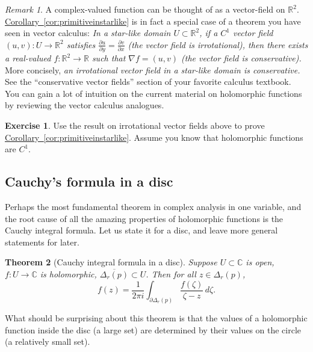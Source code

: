 \documentclass[12pt,openany]{book}
\newcommand{\C}{{\mathbb{C}}}
\newcommand{\R}{{\mathbb{R}}}
\theoremstyle{plain}
\newtheorem{thm}{Theorem}[section]
\theoremstyle{remark}
\newtheorem{remark}[thm]{Remark}
\theoremstyle{definition}
\newenvironment{exbox}{%
    \def\FrameCommand{\vrule width 1pt \relax\hspace{10pt}}%
    \MakeFramed{\advance\hsize-\width\FrameRestore}%
}{%
    \endMakeFramed
}
\theoremstyle{exercise}
\newtheorem{exercise}{Exercise}[section]
\theoremstyle{example}
\newcommand{\corref}[1]{\hyperref[#1]{Corollary~\ref*{#1}}}
\begin{document}
\begin{remark}
A complex-valued function can be thought of as a vector-field on $\R^2$.
\corref{cor:primitiveinstarlike}
is in fact a special case of a theorem you have seen
in vector calculus:  \emph{In a star-like domain $U \subset \R^2$, if a
$C^1$ vector field $(u,v) \colon U \to \R^2$
satisfies $\frac{\partial u}{\partial y} = \frac{\partial v}{\partial x}$
(the vector field is \emph{irrotational}),
then there exists a real-valued $f \colon \R^2 \to \R$ such that
$\nabla f = (u,v)$ (the vector field is conservative).}
More concisely, \emph{an irrotational vector field
in a star-like domain is conservative.}  See the ``conservative vector
fields'' section of your favorite calculus textbook.  You can gain a lot of
intuition on the current material on holomorphic functions by reviewing the
vector calculus analogues.
\end{remark}

\begin{exbox}
\begin{exercise}
Use the result on irrotational vector fields above to prove 
\corref{cor:primitiveinstarlike}.
Assume you know that holomorphic functions are $C^1$.
\end{exercise}
\end{exbox}

\subsection{Cauchy's formula in a disc}

Perhaps the most fundamental theorem in complex analysis in one variable,
and the root cause of all the amazing properties of holomorphic functions
is the Cauchy integral formula.  Let us state it for a disc, and leave
more general statements for later.

\begin{thm}[Cauchy integral formula in a disc]
Suppose $U \subset \C$ is open, $f \colon U \to \C$ is holomorphic,
$\overline{\Delta_r(p)} \subset U$.
Then for all $z \in \Delta_r(p)$,
\begin{equation*}
f(z)
=
\frac{1}{2\pi i}
\int_{\partial \Delta_r(p)}
\frac{f(\zeta)}{\zeta-z}
\,
d \zeta .
\end{equation*}
\end{thm}

What should be surprising about this theorem is that the values of a
holomorphic function inside the disc (a large set) are determined by their
values on the circle (a relatively small set).
\end{document}
